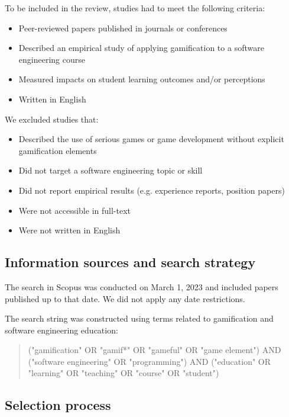 \documentclass[
	hf,
	]{ceurart}
\begin{document}
		To be included in the review, studies had to meet the following criteria:
		
		\begin{itemize}
			\item Peer-reviewed papers published in journals or conferences
			\item Described an empirical study of applying gamification to a software engineering course
			\item Measured impacts on student learning outcomes and/or perceptions
			\item Written in English
		\end{itemize}
		
		We excluded studies that:
		
		\begin{itemize}
			\item Described the use of serious games or game development without explicit gamification elements
			\item Did not target a software engineering topic or skill
			\item Did not report empirical results (e.g. experience reports, position papers)
			\item Were not accessible in full-text
			\item Were not written in English  
		\end{itemize}
		
		\subsection{Information sources and search strategy}
		
		The search in Scopus was conducted on March 1, 2023 and included papers published up to that date. We did not apply any date restrictions.
		
		The search string was constructed using terms related to gamification and software engineering education: 
		
		\begin{quote}
			("gamification" OR "gamif*" OR "gameful" OR "game element") AND ("software engineering" OR "programming") AND  ("education" OR "learning" OR "teaching" OR "course" OR "student")
		\end{quote}
		
		
		\subsection{Selection process}
		
\end{document}
